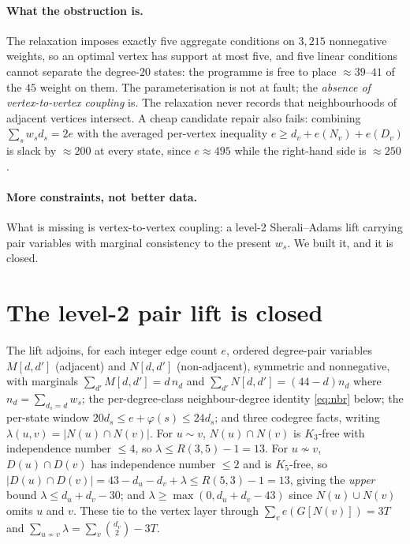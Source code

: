 \documentclass[11pt]{article}
\theoremstyle{definition}
\begin{document}
\paragraph{What the obstruction is.} The relaxation imposes exactly five
aggregate conditions on $3{,}215$ nonnegative weights, so an optimal vertex has
support at most five, and five linear conditions cannot separate the degree-$20$
states: the programme is free to place $\approx39$--$41$ of the $45$ weight on
them. The parameterisation is not at fault; the \emph{absence of vertex-to-vertex
coupling} is. The relaxation never records that neighbourhoods of adjacent
vertices intersect. A cheap candidate repair also fails: combining
$\sum_s w_sd_s=2e$ with the averaged per-vertex inequality
$e\ge d_v+e(N_v)+e(D_v)$ is slack by $\approx200$ at every state, since
$e\approx495$ while the right-hand side is $\approx250$.

\paragraph{More constraints, not better data.} What is missing is vertex-to-vertex
coupling: a level-2 Sherali--Adams lift carrying pair variables with marginal
consistency to the present $w_s$. We built it, and it is closed.

\section{The level-2 pair lift is closed}\label{sec:lift}

The lift adjoins, for each integer edge count $e$, ordered degree-pair variables
$M[d,d']$ (adjacent) and $N[d,d']$ (non-adjacent), symmetric and nonnegative,
with marginals $\sum_{d'}M[d,d']=d\,n_d$ and $\sum_{d'}N[d,d']=(44-d)n_d$ where
$n_d=\sum_{d_s=d}w_s$; the per-degree-class neighbour-degree identity
\eqref{eq:nbr} below; the per-state window $20d_s\le e+\varphi(s)\le24d_s$; and
three codegree facts, writing $\lambda(u,v)=|N(u)\cap N(v)|$. For $u\sim v$,
$N(u)\cap N(v)$ is $K_3$-free with independence number $\le4$, so
$\lambda\le R(3,5)-1=13$. For $u\not\sim v$, $D(u)\cap D(v)$ has independence
number $\le2$ and is $K_5$-free, so
$|D(u)\cap D(v)|=43-d_u-d_v+\lambda\le R(5,3)-1=13$, giving the \emph{upper}
bound $\lambda\le d_u+d_v-30$; and $\lambda\ge\max(0,d_u+d_v-43)$ since
$N(u)\cup N(v)$ omits $u$ and $v$. These tie to the vertex layer through
$\sum_v e(G[N(v)])=3T$ and
$\sum_{u\not\sim v}\lambda=\sum_v\binom{d_v}{2}-3T$.
\end{document}
